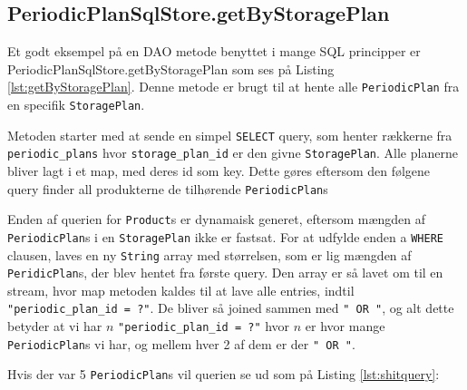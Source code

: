 \subsection{PeriodicPlanSqlStore.getByStoragePlan}
Et godt eksempel på en DAO metode benyttet i mange SQL principper er PeriodicPlanSqlStore.getByStoragePlan som ses på Listing \ref{lst:getByStoragePlan}. Denne metode er brugt til at hente alle \texttt{PeriodicPlan} fra en specifik \texttt{StoragePlan}.

Metoden starter med at sende en simpel \texttt{SELECT} query, som henter rækkerne fra 
\texttt{periodic\_plans} hvor \texttt{storage\_plan\_id} er den givne \texttt{StoragePlan}. Alle planerne bliver lagt i et map, med deres id som key. Dette gøres eftersom den følgene query finder all produkterne de tilhørende \texttt{PeriodicPlan}s

Enden af querien for \texttt{Product}s er dynamaisk generet, eftersom mængden af \texttt{PeriodicPlan}s i en \texttt{StoragePlan} ikke er fastsat. For at udfylde enden a \texttt{WHERE} clausen, laves en ny \texttt{String} array med størrelsen, som er lig mængden af \texttt{PeridicPlan}s, der blev hentet fra første query. Den array er så  lavet om til en stream, hvor map metoden kaldes til at lave alle entries, indtil \texttt{"periodic\_plan\_id = ?"}. De bliver så joined sammen med \texttt{" OR "}, og alt dette betyder at vi har $n$ \texttt{"periodic\_plan\_id = ?"} hvor $n$ er hvor mange \texttt{PeriodicPlan}s vi har, og mellem hver 2 af dem er der \texttt{" OR "}.

Hvis der var 5 \texttt{PeriodicPlan}s vil querien se ud som på Listing \ref{lst:shitquery}:

